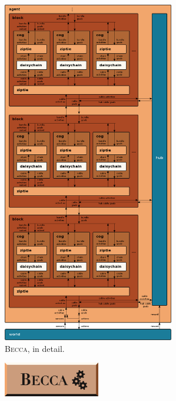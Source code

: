 \documentclass[oneside,twocolumn]{article}
\begin{document}
\begin{figure}[ht]
\centering
\includegraphics[height=15.0cm]{figs/becca.png}
\caption{\textsc{Becca}, in detail.}
\label{becca}
\end{figure}



\begin{figure}[ht]
\centering
\includegraphics[height=1.5cm]{figs/logo_plate.png}
\end{figure}


%
%
\end{document}
